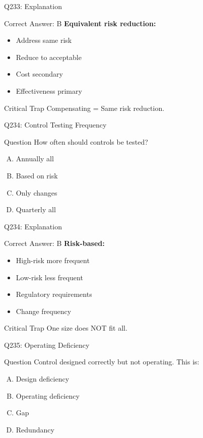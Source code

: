 \documentclass{beamer}
\begin{document}
	\begin{frame}{Q233: Explanation}
		\begin{block}{Correct Answer: B}
			\textbf{Equivalent risk reduction:}
			\begin{itemize}
				\item Address same risk
				\item Reduce to acceptable
				\item Cost secondary
				\item Effectiveness primary
			\end{itemize}
		\end{block}
		\begin{alertblock}{Critical Trap}
			Compensating = Same risk reduction.
		\end{alertblock}
	\end{frame}
	
	\begin{frame}{Q234: Control Testing Frequency}
		\begin{block}{Question}
			How often should controls be tested?
		\end{block}
		\begin{enumerate}[(A)]
			\item Annually all
			\item Based on risk
			\item Only changes
			\item Quarterly all
		\end{enumerate}
	\end{frame}
	
	\begin{frame}{Q234: Explanation}
		\begin{block}{Correct Answer: B}
			\textbf{Risk-based:}
			\begin{itemize}
				\item High-risk more frequent
				\item Low-risk less frequent
				\item Regulatory requirements
				\item Change frequency
			\end{itemize}
		\end{block}
		\begin{alertblock}{Critical Trap}
			One size does NOT fit all.
		\end{alertblock}
	\end{frame}
	
	\begin{frame}{Q235: Operating Deficiency}
		\begin{block}{Question}
			Control designed correctly but not operating. This is:
		\end{block}
		\begin{enumerate}[(A)]
			\item Design deficiency
			\item Operating deficiency
			\item Gap
			\item Redundancy
		\end{enumerate}
	\end{frame}
	
\end{document}
